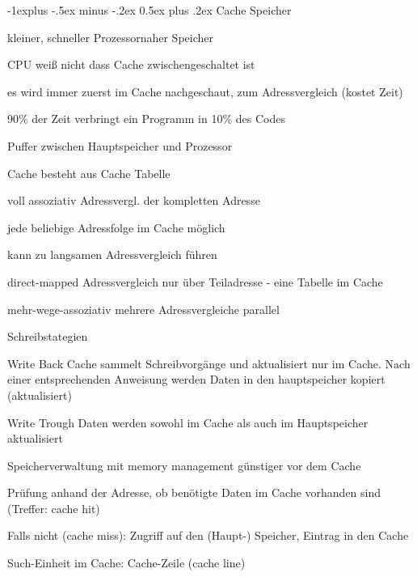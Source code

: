 \documentclass[10pt,landscape]{article}
\makeatletter
\renewcommand{\subsection}{\@startsection{subsection}{2}{0mm}%
                                {-1explus -.5ex minus -.2ex}%
                                {0.5ex plus .2ex}%
                                {\normalfont\normalsize\bfseries}}
\makeatother
\begin{document}
\begin{multicols}{3}
  \subsection{Cache Speicher}
  \begin{itemize*}
    \item kleiner, schneller Prozessornaher Speicher
    \item CPU weiß nicht dass Cache zwischengeschaltet ist
    \item es wird immer zuerst im Cache nachgeschaut, zum Adressvergleich (kostet Zeit)
    \item 90\% der Zeit verbringt ein Programm in 10\% des Codes
    \item Puffer zwischen Hauptspeicher und Prozessor
    \item Cache besteht aus Cache Tabelle
    \begin{description*}
      \item[voll assoziativ] Adressvergl. der kompletten Adresse
      \item jede beliebige Adressfolge im Cache möglich
      \item kann zu langsamen Adressvergleich führen
      \item[direct-mapped] Adressvergleich nur über Teiladresse - eine Tabelle im Cache
      \item[mehr-wege-assoziativ] mehrere Adressvergleiche parallel
    \end{description*}
    \item Schreibstategien
    \begin{description*}
      \item[Write Back] Cache sammelt Schreibvorgänge und aktualisiert nur im Cache. Nach einer entsprechenden Anweisung werden Daten in den hauptspeicher kopiert (aktualisiert)
      \item[Write Trough] Daten werden sowohl im Cache als auch im Hauptspeicher aktualisiert
    \end{description*}
    \item Speicherverwaltung mit memory management günstiger vor dem Cache
    \item Prüfung anhand der Adresse, ob benötigte Daten im Cache vorhanden sind (Treffer: cache hit)
    \item Falls nicht (cache miss): Zugriff auf den (Haupt-) Speicher, Eintrag in den Cache
    \item Such-Einheit im Cache: Cache-Zeile (cache line)

\end{itemize*}
\end{multicols}
\end{document}
